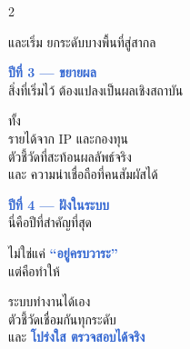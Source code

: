 \documentclass[10pt]{article}
\begin{document}
\begin{tcolorbox}[breakable,colback=panel,colframe=line,boxrule=0.5pt,arc=2mm,left=3mm,right=3mm,top=2mm,bottom=2mm]
\begin{multicols}{2}
\par และเริ่ม ยกระดับบางพื้นที่สู่สากล
\par \textbf{\textcolor{highlight}{ปีที่ 3 — ขยายผล}}\\ สิ่งที่เริ่มไว้ ต้องแปลงเป็นผลเชิงสถาบัน
\par ทั้ง\\ รายได้จาก IP และกองทุน\\ ตัวชี้วัดที่สะท้อนผลลัพธ์จริง\\ และ ความน่าเชื่อถือที่คนสัมผัสได้
\par \textbf{\textcolor{highlight}{ปีที่ 4 — ฝังในระบบ}}\\ นี่คือปีที่สำคัญที่สุด
\par ไม่ใช่แค่ \textbf{\textcolor{highlight}{“อยู่ครบวาระ”}}\\ แต่คือทำให้
\par ระบบทำงานได้เอง\\ ตัวชี้วัดเชื่อมกันทุกระดับ\\ และ \textbf{\textcolor{highlight}{โปร่งใส ตรวจสอบได้จริง}}
\end{multicols}
\end{tcolorbox}

\clearpage
\end{document}
